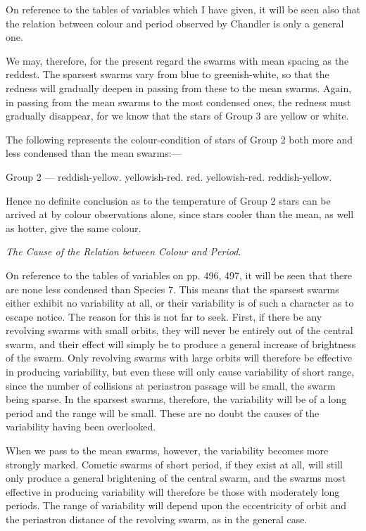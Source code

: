 \documentclass[a4paper, 12pt, oneside, polutonikogreek, english]{article}
\begin{document}
On reference to the tables of variables which I have given, it will be seen also that the relation between colour and period observed by Chandler is only a general one.

We may, therefore, for the present regard the swarms with mean spacing as the reddest. The sparsest swarms vary from blue to greenish-white, so that the redness will gradually deepen in passing from these to the mean swarms. Again, in passing from the mean swarms to the most condensed ones, the redness must gradually disappear, for we know that the stars of Group 3 are yellow or white.

The following represents the colour-condition of stars of Group 2 both more and less condensed than the mean swarms:---

Group 2 --- {reddish-yellow. yellowish-red. red. yellowish-red. reddish-yellow.}

Hence no definite conclusion as to the temperature of Group 2 stars can be arrived at by colour observations alone, since stars cooler than the mean, as well as hotter, give the same colour.

\emph{The Cause of the Relation between Colour and Period.}

On reference to the tables of variables on pp. 496, 497, it will be seen that there are none less condensed than Species 7. This means that the sparsest swarms either exhibit no variability at all, or their variability is of such a character as to escape notice. The reason for this is not far to seek. First, if there be any revolving swarms with small orbits, they will never be entirely out of the central swarm, and their effect will simply be to produce a general increase of brightness of the swarm. Only revolving swarms with large orbits will therefore be effective in producing variability, but even these will only cause variability of short range, since the number of collisions at periastron passage will be small, the swarm being sparse. In the sparsest swarms, therefore, the variability will be of a long period and the range will be small. These are no doubt the causes of the variability having been overlooked.

When we pass to the mean swarms, however, the variability becomes more strongly marked. Cometic swarms of short period, if they exist at all, will still only produce a general brightening of the central swarm, and the swarms most effective in producing variability will therefore be those with moderately long periods. The range of variability will depend upon the eccentricity of orbit and the periastron distance of the revolving swarm, as in the general case.
\end{document}

